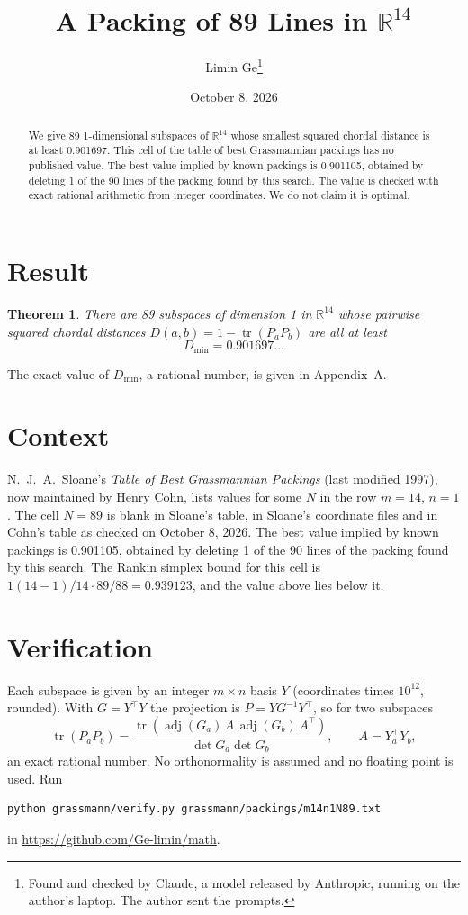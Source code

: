 \documentclass[11pt,a4paper]{article}
\title{A Packing of 89 Lines in $\mathbb{R}^{14}$}
\author{Limin Ge\thanks{Found and checked by Claude, a model released by Anthropic, running on the author's laptop. The author sent the prompts.}}
\date{October 8, 2026}
\newtheorem*{theorem}{Theorem}
\begin{document}
\maketitle
\begin{abstract}
We give 89 1-dimensional subspaces of $\mathbb{R}^{14}$ whose smallest squared chordal distance is at least 0.901697. This cell of the table of best Grassmannian packings has no published value. The best value implied by known packings is 0.901105, obtained by deleting 1 of the 90 lines of the packing found by this search. The value is checked with exact rational arithmetic from integer coordinates. We do not claim it is optimal.
\end{abstract}

\section{Result}
\begin{theorem}
There are 89 subspaces of dimension 1 in $\mathbb{R}^{14}$ whose pairwise squared chordal distances $D(a,b) = 1 - \operatorname{tr}(P_aP_b)$ are all at least
\[ D_{\min} = 0.901697\ldots \]
\end{theorem}
The exact value of $D_{\min}$, a rational number, is given in Appendix~A.


\section{Context}
N.~J.~A.~Sloane's \emph{Table of Best Grassmannian Packings} (last modified 1997), now maintained by Henry Cohn, lists values for some $N$ in the row $m=14$, $n=1$. The cell $N=89$ is blank in Sloane's table, in Sloane's coordinate files and in Cohn's table as checked on October 8, 2026. The best value implied by known packings is 0.901105, obtained by deleting 1 of the 90 lines of the packing found by this search. The Rankin simplex bound for this cell is $1(14-1)/14\cdot 89/88 = 0.939123$, and the value above lies below it.


\section{Verification}
Each subspace is given by an integer $m\times n$ basis $Y$ (coordinates times $10^{12}$, rounded). With $G=Y^\top Y$ the projection is $P=YG^{-1}Y^\top$, so for two subspaces
\[ \operatorname{tr}(P_aP_b)=\frac{\operatorname{tr}(\operatorname{adj}(G_a)\,A\,\operatorname{adj}(G_b)\,A^\top)}{\det G_a\det G_b},\qquad A=Y_a^\top Y_b, \]
an exact rational number. No orthonormality is assumed and no floating point is used. Run
\begin{verbatim}
python grassmann/verify.py grassmann/packings/m14n1N89.txt
\end{verbatim}
in \url{https://github.com/Ge-limin/math}.
\end{document}

